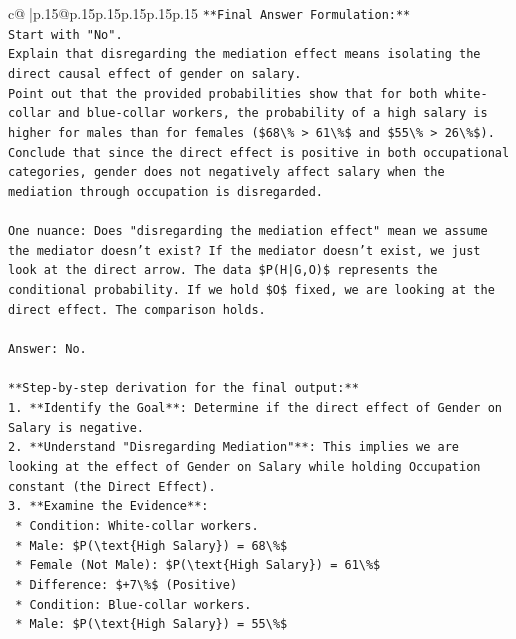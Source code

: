 \documentclass{article}
\begin{document}
{\begin{supertabular}{c@{$\;$}|p{.15\linewidth}@{}p{.15\linewidth}p{.15\linewidth}p{.15\linewidth}p{.15\linewidth}p{.15\linewidth}}
{{{\texttt{**Final Answer Formulation:**} \\
\texttt{Start with "No".} \\
\texttt{Explain that disregarding the mediation effect means isolating the direct causal effect of gender on salary.} \\
\texttt{Point out that the provided probabilities show that for both white{-}collar and blue{-}collar workers, the probability of a high salary is higher for males than for females (\$68\textbackslash{}\% > 61\textbackslash{}\%\$ and \$55\textbackslash{}\% > 26\textbackslash{}\%\$).} \\
\texttt{Conclude that since the direct effect is positive in both occupational categories, gender does not negatively affect salary when the mediation through occupation is disregarded.} \\
\\ 
\texttt{One nuance: Does "disregarding the mediation effect" mean we assume the mediator doesn't exist? If the mediator doesn't exist, we just look at the direct arrow. The data \$P(H|G,O)\$ represents the conditional probability. If we hold \$O\$ fixed, we are looking at the direct effect. The comparison holds.} \\
\\ 
\texttt{Answer: No.} \\
\\ 
\texttt{**Step{-}by{-}step derivation for the final output:**} \\
\texttt{1.  **Identify the Goal**: Determine if the direct effect of Gender on Salary is negative.} \\
\texttt{2.  **Understand "Disregarding Mediation"**: This implies we are looking at the effect of Gender on Salary while holding Occupation constant (the Direct Effect).} \\
\texttt{3.  **Examine the Evidence**:} \\
\texttt{    *   Condition: White{-}collar workers.} \\
\texttt{        *   Male: \$P(\textbackslash{}text\{High Salary\}) = 68\textbackslash{}\%\$} \\
\texttt{        *   Female (Not Male): \$P(\textbackslash{}text\{High Salary\}) = 61\textbackslash{}\%\$} \\
\texttt{        *   Difference: \$+7\textbackslash{}\%\$ (Positive)} \\
\texttt{    *   Condition: Blue{-}collar workers.} \\
\texttt{        *   Male: \$P(\textbackslash{}text\{High Salary\}) = 55\textbackslash{}\%\$} \\
}}}
\end{supertabular}}
\end{document}
